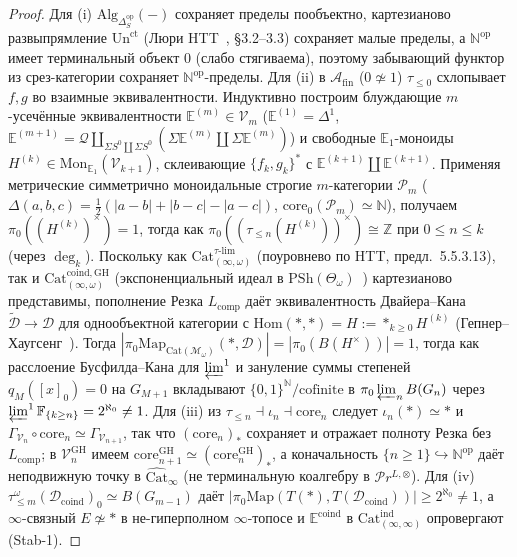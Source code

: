 \documentclass[11pt]{article}
\theoremstyle{plain}
\theoremstyle{definition}
\newcommand{\Hom}{\mathrm{Hom}}
\newcommand{\Cat}{\mathrm{Cat}}
\begin{document}
\begin{proof}
Для (i) $\mathrm{Alg}_{\Delta_S^{\mathrm{op}}}(-)$ сохраняет пределы пообъектно, картезианово развыпрямление $\mathrm{Un}^{\mathrm{ct}}$ (Люри HTT~\cite{LurieHTT}, \S 3.2--3.3) сохраняет малые пределы, а $\mathbb{N}^{\mathrm{op}}$ имеет терминальный объект $0$ (слабо стягиваема), поэтому забывающий функтор из срез-категории сохраняет $\mathbb{N}^{\mathrm{op}}$-пределы. Для (ii) в $\mathcal{A}_{\mathrm{fin}}$ ($0 \not\simeq 1$) $\tau_{\le 0}$ схлопывает $f, g$ во взаимные эквивалентности. Индуктивно построим блуждающие $m$-усечённые эквивалентности $\mathbb{E}^{(m)} \in \mathcal{V}_m$ ($\mathbb{E}^{(1)} = \Delta^1$, $\mathbb{E}^{(m+1)} = \mathcal{Q} \amalg_{\Sigma S^0 \amalg \Sigma S^0} (\Sigma\mathbb{E}^{(m)} \amalg \Sigma\mathbb{E}^{(m)})$) и свободные $\mathbb{E}_1$-моноиды $H^{(k)} \in \mathrm{Mon}_{\mathbb{E}_1}(\mathcal{V}_{k+1})$, склеивающие $\{f_k, g_k\}^*$ с $\mathbb{E}^{(k+1)} \amalg \mathbb{E}^{(k+1)}$. Применяя метрические симметрично моноидальные строгие $m$-категории $\mathcal{P}_m$ ($\Delta(a,b,c) = \tfrac{1}{2}(|a-b|+|b-c|-|a-c|)$, $\mathrm{core}_0(\mathcal{P}_m) \simeq \mathbb{N}$), получаем $\pi_0((H^{(k)})^\times) = 1$, тогда как $\pi_0((\tau_{\le n}(H^{(k)}))^\times) \cong \mathbb{Z}$ при $0 \le n \le k$ (через $\deg_k$). Поскольку как $\Cat_{(\infty,\omega)}^{\tau\text{-}\mathrm{lim}}$ (поуровнево по HTT, предл.~5.5.3.13), так и $\Cat_{(\infty,\omega)}^{\mathrm{coind, GH}}$ (экспоненциальный идеал в $\mathrm{PSh}(\Theta_\omega)$~\cite{Goldthorpe2023}) картезианово представимы, пополнение Резка $L_{\mathrm{comp}}$ даёт эквивалентность Двайера--Кана $\widetilde{\mathcal{D}} \to \mathcal{D}$ для однообъектной категории с $\Hom(*,*)=H := \ast_{k\ge 0} H^{(k)}$ (Гепнер--Хаугсенг~\cite{GepnerHaugseng2015}). Тогда $|\pi_0\mathrm{Map}_{\Cat(\mathcal{M}_\omega)}(*, \mathcal{D})| = |\pi_0(B(H^\times))| = 1$, тогда как расслоение Бусфилда--Кана для $\varprojlim^1$ и зануление суммы степеней $q_M([x]_0) = 0$ на $G_{M+1}$ вкладывают $\{0,1\}^{\mathbb{N}}/\text{cofinite}$ в $\pi_0 \varprojlim_n B(G_n)$ через $\varprojlim^1 \mathbb{F}_{\{k \ge n\}} = 2^{\aleph_0} \neq 1$. Для (iii) из $\tau_{\le n} \dashv \iota_n \dashv \mathrm{core}_n$ следует $\iota_n(*) \simeq *$ и $\Gamma_{\mathcal{V}_n} \circ \mathrm{core}_n \simeq \Gamma_{\mathcal{V}_{n+1}}$, так что $(\mathrm{core}_n)_*$ сохраняет и отражает полноту Резка без $L_{\mathrm{comp}}$; в $\mathcal{V}_n^{\mathrm{GH}}$ имеем $\mathrm{core}_{n+1}^{\mathrm{GH}} \simeq (\mathrm{core}_n^{\mathrm{GH}})_*$, а коначальность $\{n \ge 1\} \hookrightarrow \mathbb{N}^{\mathrm{op}}$ даёт неподвижную точку в $\widehat{\Cat}_\infty$ (не терминальную коалгебру в $\mathcal{P}r^{L,\otimes}$). Для (iv) $\tau_{\le m}^\omega(\mathcal{D}_{\mathrm{coind}})_0 \simeq B(G_{m-1})$ даёт $|\pi_0\mathrm{Map}(T(*), T(\mathcal{D}_{\mathrm{coind}}))| \ge 2^{\aleph_0} \neq 1$, а $\infty$-связный $E \not\simeq *$ в не-гиперполном $\infty$-топосе и $\mathbb{E}^{\mathrm{coind}}$ в $\Cat_{(\infty,\infty)}^{\mathrm{ind}}$ опровергают (Stab-1).
\end{proof}
\end{document}
